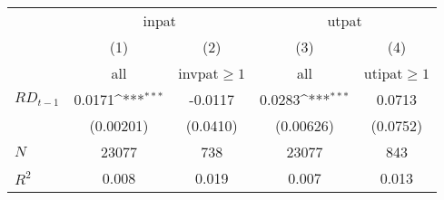 {
\def\sym#1{\ifmmode^{#1}\else\(^{#1}\)\fi}
\begin{tabular}{l*{4}{c}}
\hline\hline
            &\multicolumn{2}{c}{inpat}&\multicolumn{2}{c}{utpat}\\\cmidrule{2-5}
            &\multicolumn{1}{c}{(1)}&\multicolumn{1}{c}{(2)}&\multicolumn{1}{c}{(3)}&\multicolumn{1}{c}{(4)}\\
            &\multicolumn{1}{c}{all}&\multicolumn{1}{c}{invpat$\geq 1$}&\multicolumn{1}{c}{all}&\multicolumn{1}{c}{utipat$\geq 1$}\\
           
\hline
$RD_{t-1}$       &      0.0171\sym{***}&     -0.0117         &      0.0283\sym{***}&      0.0713         \\
            &   (0.00201)         &    (0.0410)         &   (0.00626)         &    (0.0752)         \\
\hline
\(N\)       &       23077         &         738         &       23077         &         843         \\
\(R^{2}\)   &       0.008         &       0.019         &       0.007         &       0.013         \\
\hline\hline
\end{tabular}
}
